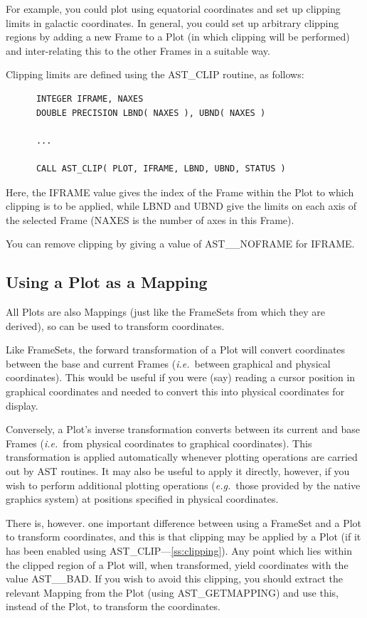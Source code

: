 \documentclass[twoside,11pt]{article}
\newcommand{\htmlref}[2]{#1}
\newcommand{\secref}[1]{\S\ref{#1}}
\renewcommand{\secref}[1]{\ref{#1}}
\begin{document}
For example, you could plot using equatorial coordinates and set up
clipping limits in galactic coordinates. In general, you could set up
arbitrary clipping regions by adding a new Frame to a Plot (in which
clipping will be performed) and inter-relating this to the other
Frames in a suitable way.

Clipping limits are defined using the \htmlref{AST\_CLIP}{AST_CLIP} routine, as follows:

\small
\begin{verbatim}
      INTEGER IFRAME, NAXES
      DOUBLE PRECISION LBND( NAXES ), UBND( NAXES )

      ...

      CALL AST_CLIP( PLOT, IFRAME, LBND, UBND, STATUS )
\end{verbatim}
\normalsize

Here, the IFRAME value gives the index of the Frame within the Plot to
which clipping is to be applied, while LBND and UBND give the limits
on each axis of the selected Frame (NAXES is the number of axes in
this Frame).

You can remove clipping by giving a value of AST\_\_NOFRAME for IFRAME.

\subsection{Using a Plot as a Mapping}

All Plots are also Mappings (just like the FrameSets from which they
are derived), so can be used to transform coordinates.

Like FrameSets, the forward transformation of a \htmlref{Plot}{Plot} will convert
coordinates between the base and current Frames ({\em{i.e.}}\ between
graphical and physical coordinates). This would be useful if you were
(say) reading a cursor position in graphical coordinates and needed to
convert this into physical coordinates for display.

Conversely, a Plot's inverse transformation converts between its
current and base Frames ({\em{i.e.}}\ from physical coordinates to
graphical coordinates). This transformation is applied automatically
whenever plotting operations are carried out by AST routines. It may
also be useful to apply it directly, however, if you wish to perform
additional plotting operations ({\em{e.g.}}\ those provided by the
native graphics system) at positions specified in physical
coordinates.

There is, however. one important difference between using a \htmlref{FrameSet}{FrameSet}
and a Plot to transform coordinates, and this is that clipping may be
applied by a Plot (if it has been enabled using
\htmlref{AST\_CLIP}{AST_CLIP}---\secref{ss:clipping}). Any point which lies within the
clipped region of a Plot will, when transformed, yield coordinates
with the value AST\_\_BAD. If you wish to avoid this clipping, you
should extract the relevant \htmlref{Mapping}{Mapping} from the Plot (using
\htmlref{AST\_GETMAPPING}{AST_GETMAPPING}) and use this, instead of the Plot, to transform the
coordinates.
\end{document}
